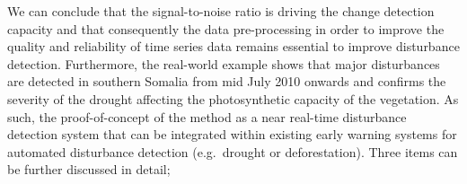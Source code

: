 \documentclass[authoryear,preprint,review,10pt]{elsarticle}
\begin{document}
We can conclude that the signal-to-noise ratio is driving the change detection capacity and that consequently the data pre-processing in order to improve the quality and reliability of time series data remains essential to improve disturbance detection. Furthermore, the real-world example shows that major disturbances are detected in southern Somalia from mid July 2010 onwards and confirms the severity of the drought affecting the photosynthetic capacity of the vegetation. As such, the proof-of-concept of the method as a near real-time disturbance detection system that can be integrated within existing early warning systems for automated disturbance detection (e.g.\ drought or deforestation). Three items can be further discussed in detail;

\end{document}
